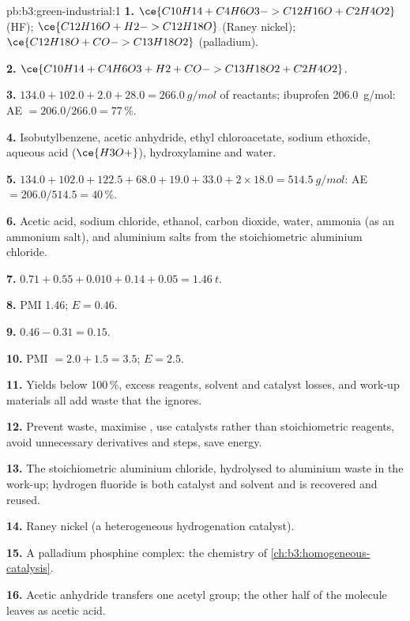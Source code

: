 \begin{solution}{pb:b3:green-industrial:1}
\textbf{1.} $\ce{C10H14 + C4H6O3 -> C12H16O + C2H4O2}$ (HF); $\ce{C12H16O + H2 -> C12H18O}$ (Raney nickel);
$\ce{C12H18O + CO -> C13H18O2}$ (palladium).

\textbf{2.} $\ce{C10H14 + C4H6O3 + H2 + CO -> C13H18O2 + C2H4O2}$.

\textbf{3.} $134.0 + 102.0 + 2.0 + 28.0 = \qty{266.0}{g/mol}$ of reactants; ibuprofen \qty{206.0}{g/mol}: AE $= 206.0/266.0 = 77$\,\%.

\textbf{4.} Isobutylbenzene, acetic anhydride, ethyl chloroacetate, sodium ethoxide,
aqueous acid ($\ce{H3O+}$), hydroxylamine and water.

\textbf{5.} $134.0 + 102.0 + 122.5 + 68.0 + 19.0 + 33.0 + 2 \times 18.0 = \qty{514.5}{g/mol}$: AE $= 206.0/514.5 = 40$\,\%.

\textbf{6.} Acetic acid, sodium chloride, ethanol, carbon dioxide, water, ammonia (as an
ammonium salt), and aluminium salts from the stoichiometric aluminium chloride.

\textbf{7.} $0.71 + 0.55 + 0.010 + 0.14 + 0.05 = \qty{1.46}{t}$.

\textbf{8.} PMI 1.46; $E = 0.46$.

\textbf{9.} $0.46 - 0.31 = 0.15$.

\textbf{10.} PMI $= 2.0 + 1.5 = 3.5$; $E = 2.5$.

\textbf{11.} Yields below 100\,\%, excess reagents, solvent and catalyst losses, and
work-up materials all add waste that the  ignores.

\textbf{12.} Prevent waste, maximise , use catalysts rather than
stoichiometric reagents, avoid unnecessary derivatives and steps, save energy.

\textbf{13.} The stoichiometric aluminium chloride, hydrolysed to aluminium waste in the
work-up; hydrogen fluoride is both catalyst and solvent and is recovered and reused.

\textbf{14.} Raney nickel (a heterogeneous hydrogenation catalyst).

\textbf{15.} A palladium phosphine complex: the  chemistry of
\cref{ch:b3:homogeneous-catalysis}.

\textbf{16.} Acetic anhydride transfers one acetyl group; the other half of the
molecule leaves as acetic acid.


\end{solution}
